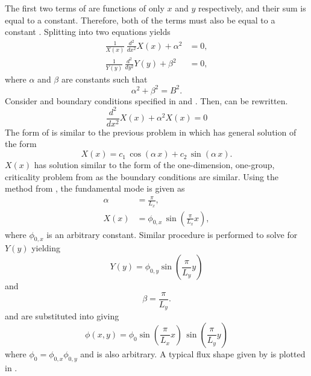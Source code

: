   The first two terms of  are functions of only $x$ and
  $y$ respectively, and their sum is equal to a constant. Therefore, both of the
  terms must also be equal to a constant \cite{lamarsh1966}. Splitting
   into two equations yields
  \begin{align}
    \label{eq:2d1g_x}
    \frac{1}{X(x)} \, \frac{d^2}{d x^2} X(x) + \alpha^2 &= 0, \\
    \label{eq:2d1g_y}
    \frac{1}{Y(y)} \, \frac{d^2}{d y^2} Y(y) + \beta^2 &= 0,
  \end{align}
  where $\alpha$ and $\beta$ are constants such that
  \begin{equation}
    \label{eq:2d1g_buckle_alphabeta}
    \alpha^2 + \beta^2 = B^2.
  \end{equation}
  Consider  and boundary conditions specified in
   and . Then,  can be
  rewritten.
  \begin{equation}
    \label{eq:2d1g_xeqn}
    \frac{d^2}{dx^2} X(x) + \alpha^2 X(x) = 0
  \end{equation}
  The form of  is similar to the previous problem in 
   which has general solution of the form
  \begin{equation}
    \label{eq:2d1g_x_general}
    X(x) = c_1 \, \cos(\alpha \, x) + c_2 \, \sin(\alpha \, x).
  \end{equation}
  $X(x)$ has solution similar to the form of the one-dimension, one-group,
  criticality problem from  as the boundary conditions are
  similar. Using the method from , the fundamental mode is
  given as
  \begin{align}
    \label{eq:2d1g_x_alpha}
    \alpha &= \frac{\pi}{L_x}, \\
    \label{eq:2d1g_x_solution}
    X(x) &= \phi_{0,x} \, \sin\left(\frac{\pi}{L_x} x\right),
  \end{align}
  where $\phi_{0,x}$ is an arbitrary constant.
  Similar procedure is performed to solve for $Y(y)$ yielding
  \begin{equation}
    \label{eq:2d1g_y_solution}
    Y(y) = \phi_{0,y} \sin\left(\frac{\pi}{L_y} y \right)
  \end{equation}
  and 
  \begin{equation}
    \label{eq:2d1g_y_beta}
    \beta = \frac{\pi}{L_y}.
  \end{equation}
   and  are substituted into
   giving
  \begin{equation}
    \label{eq:analytic_2d1g}
    \phi(x,y) = \phi_0 \sin\left(\frac{\pi}{L_x} x\right) \, 
      \sin\left(\frac{\pi}{L_y} y\right)
  \end{equation}
  where $\phi_0 = \phi_{0,x} \phi_{0,y}$ and is also arbitrary.
  A typical flux shape given by  is plotted
  in .

